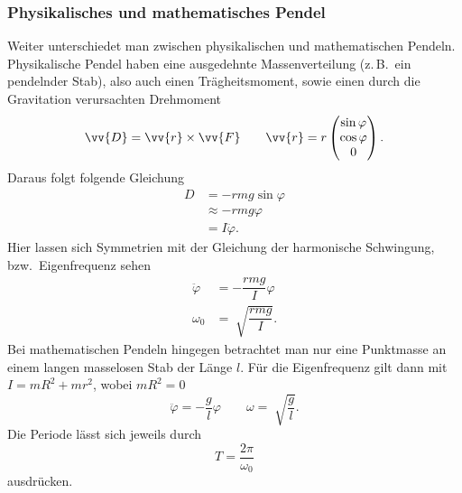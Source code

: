 \documentclass[a4paper,12pt]{article}
\numberwithin{equation}{section}
\begin{document}
\subsubsection{Physikalisches und mathematisches Pendel}
Weiter unterschiedet man zwischen physikalischen und mathematischen Pendeln. Physikalische Pendel haben eine ausgedehnte Massenverteilung (z.\,B.\ ein pendelnder Stab), also auch einen Trägheitsmoment, sowie einen durch die Gravitation verursachten Drehmoment
\[ 
        \vv{D}=\vv{r}\times \vv{F}\qquad \vv{r}=r\left(\begin{matrix}
                \sin \varphi \\\cos \varphi \\0
        \end{matrix}\right)
.\] 
Daraus folgt folgende Gleichung
\begin{align*}
        D&=-rmg\sin \varphi \\
         &\approx -rmg\varphi \\
         &=I\ddot{\varphi }
.\end{align*}
Hier lassen sich Symmetrien mit der Gleichung der harmonische Schwingung, bzw.\ Eigenfrequenz sehen
\begin{align*}
        \ddot{\varphi }&=-\dfrac{rmg}{I}\varphi\\
        \omega _0&=\sqrt[]{\dfrac{rmg}{I}}
.\end{align*}
Bei mathematischen Pendeln hingegen betrachtet man nur eine Punktmasse an einem langen masselosen Stab der Länge $l$. Für die Eigenfrequenz gilt dann mit $I=mR^2+mr^2$, wobei $mR^2=0$ 
\[ 
        \ddot{\varphi }=-\dfrac{g}{l}\varphi \qquad \omega =\sqrt[]{\dfrac{g}{l}}
.\] 
Die Periode lässt sich jeweils durch
\[ 
        T=\dfrac{2\pi }{\omega _0}
\] 
ausdrücken.
\end{document}
